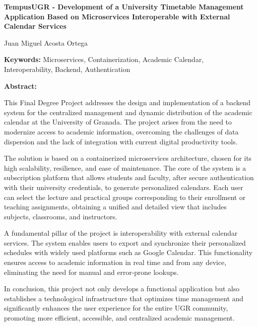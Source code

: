 \newpage
\begin{center}
    {\large \textbf{TempusUGR - Development of a University Timetable Management Application Based on Microservices Interoperable with External Calendar Services}}

    \vspace{0.2cm}
    {\normalsize Juan Miguel Acosta Ortega}

    \vspace{0.2cm}
\end{center}

\vspace{0.5cm}

\textbf{Keywords:} Microservices, Containerization, Academic Calendar, Interoperability, Backend, Authentication

\vspace{0.5cm}

\textbf{Abstract:}

This Final Degree Project addresses the design and implementation of a backend system for the centralized management and dynamic distribution of the academic calendar at the University of Granada. The project arises from the need to modernize access to academic information, overcoming the challenges of data dispersion and the lack of integration with current digital productivity tools.

The solution is based on a containerized microservices architecture, chosen for its high scalability, resilience, and ease of maintenance. The core of the system is a subscription platform that allows students and faculty, after secure authentication with their university credentials, to generate personalized calendars. Each user can select the lecture and practical groups corresponding to their enrollment or teaching assignments, obtaining a unified and detailed view that includes subjects, classrooms, and instructors.

A fundamental pillar of the project is interoperability with external calendar services. The system enables users to export and synchronize their personalized schedules with widely used platforms such as Google Calendar. This functionality ensures access to academic information in real time and from any device, eliminating the need for manual and error-prone lookups.

In conclusion, this project not only develops a functional application but also establishes a technological infrastructure that optimizes time management and significantly enhances the user experience for the entire UGR community, promoting more efficient, accessible, and centralized academic management.
